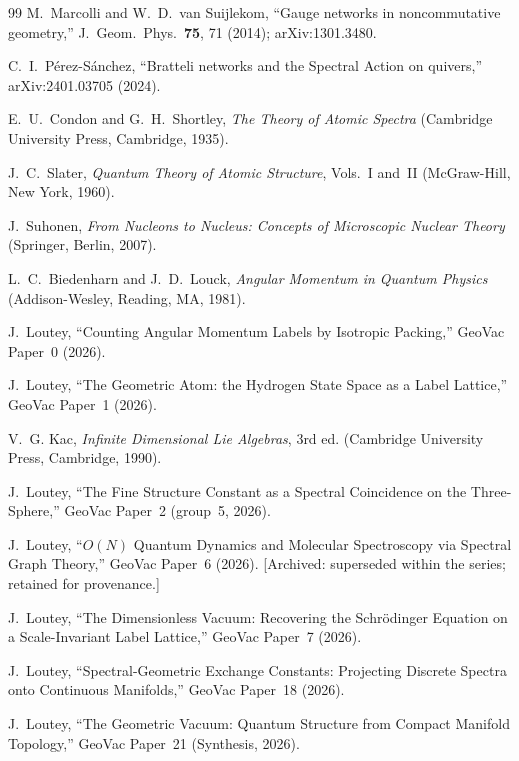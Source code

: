\documentclass[aps,pra,twocolumn,superscriptaddress,longbibliography]{revtex4-2}
\begin{document}
\begin{thebibliography}{99}
M.~Marcolli and W.~D.~van Suijlekom,
``Gauge networks in noncommutative geometry,''
J.\ Geom.\ Phys.\ \textbf{75}, 71 (2014); arXiv:1301.3480.

C.~I.~P\'erez-S\'anchez,
``Bratteli networks and the Spectral Action on quivers,''
arXiv:2401.03705 (2024).

E.~U.~Condon and G.~H.~Shortley,
\textit{The Theory of Atomic Spectra}
(Cambridge University Press, Cambridge, 1935).

J.~C.~Slater,
\textit{Quantum Theory of Atomic Structure}, Vols.~I and~II
(McGraw-Hill, New York, 1960).

J.~Suhonen,
\textit{From Nucleons to Nucleus: Concepts of Microscopic Nuclear Theory}
(Springer, Berlin, 2007).

L.~C.~Biedenharn and J.~D.~Louck,
\textit{Angular Momentum in Quantum Physics}
(Addison-Wesley, Reading, MA, 1981).


J.~Loutey,
``Counting Angular Momentum Labels by Isotropic Packing,''
GeoVac Paper~0 (2026).

J.~Loutey,
``The Geometric Atom: the Hydrogen State Space as a Label Lattice,''
GeoVac Paper~1 (2026).

V.~G. Kac,
\textit{Infinite Dimensional Lie Algebras}, 3rd ed.
(Cambridge University Press, Cambridge, 1990).

J.~Loutey,
``The Fine Structure Constant as a Spectral Coincidence on the Three-Sphere,''
GeoVac Paper~2 (group~5, 2026).

J.~Loutey,
``$O(N)$ Quantum Dynamics and Molecular Spectroscopy via Spectral Graph Theory,''
GeoVac Paper~6 (2026).
[Archived: superseded within the series; retained for provenance.]

J.~Loutey,
``The Dimensionless Vacuum: Recovering the Schr\"odinger Equation on a Scale-Invariant Label Lattice,''
GeoVac Paper~7 (2026).

J.~Loutey,
``Spectral-Geometric Exchange Constants: Projecting Discrete Spectra onto Continuous Manifolds,''
GeoVac Paper~18 (2026).

J.~Loutey,
``The Geometric Vacuum: Quantum Structure from Compact Manifold Topology,''
GeoVac Paper~21 (Synthesis, 2026).


\end{thebibliography}
\end{document}
